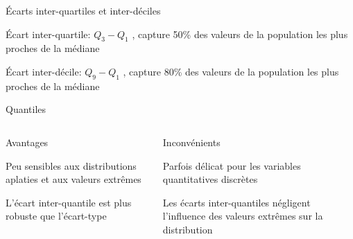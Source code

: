 \documentclass{beamer}
\begin{document}
\begin{frame}{Écarts inter-quartiles et inter-déciles}


\alert{Écart inter-quartile}: $Q_3-Q_1$ , capture 50\% des valeurs de la population les plus proches de la médiane

\vspace{1cm}


\alert{Écart inter-décile}: $Q_9-Q_1$ , capture 80\% des valeurs de la population les plus proches de la médiane

\end{frame}


\begin{frame}{Quantiles}




\begin{columns}[T,onlytextwidth]
\begin{block}{Avantages}

Peu sensibles aux distributions aplaties et aux valeurs extrêmes

L'écart inter-quantile est plus robuste que l'écart-type
\end{block}

\begin{block}{Inconvénients}

Parfois délicat pour les variables quantitatives discrètes

Les écarts inter-quantiles négligent l'influence des valeurs extrêmes sur la distribution
\end{block}


\end{columns}







\end{frame}
\end{document}
